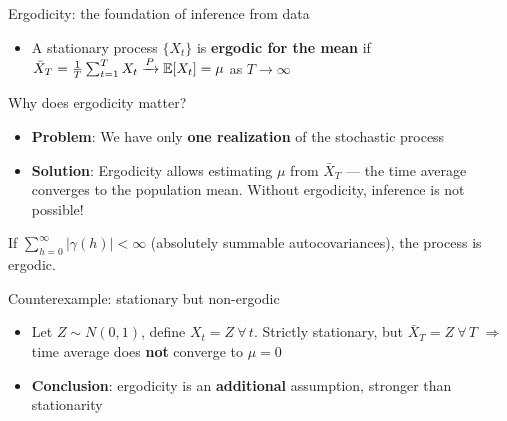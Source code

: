 \documentclass[9pt, aspectratio=169, t]{beamer}
\begin{document}
\begin{frame}{Ergodicity: the foundation of inference from data}
    \footnotesize
    \vspace{-1mm}
    \begin{defn}
        \begin{itemize}\setlength{\itemsep}{0pt}
            \item A stationary process $\{X_t\}$ is \textbf{ergodic for the mean} if
            $\bar{X}_T = \frac{1}{T}\sum_{t=1}^{T} X_t \xrightarrow{P} \mathbb{E}[X_t] = \mu$ as $T \to \infty$
        \end{itemize}
    \end{defn}
    \vspace{-2mm}
    \begin{alertblock}{Why does ergodicity matter?}
        \begin{itemize}\setlength{\itemsep}{0pt}
            \item \textbf{Problem}: We have only \textbf{one realization} of the stochastic process
            \item \textbf{Solution}: Ergodicity allows estimating $\mu$ from $\bar{X}_T$ --- the time average converges to the population mean. Without ergodicity, inference is not possible!
        \end{itemize}
    \end{alertblock}
    \vspace{-2mm}
    \begin{thm}
        If $\sum_{h=0}^{\infty} |\gamma(h)| < \infty$ (absolutely summable autocovariances), the process is ergodic.
    \end{thm}
    \vspace{-2mm}
    {\scriptsize
    \begin{alertblock}{Counterexample: stationary but non-ergodic}
        \begin{itemize}\setlength{\itemsep}{0pt}
            \item Let $Z \sim N(0,1)$, define $X_t = Z\ \forall\, t$. Strictly stationary, but $\bar{X}_T = Z\ \forall\, T$ $\Rightarrow$ time average does \textbf{not} converge to $\mu = 0$
            \item \textbf{Conclusion}: ergodicity is an \textbf{additional} assumption, stronger than stationarity
        \end{itemize}
    \end{alertblock}
    }
\end{frame}
\end{document}
